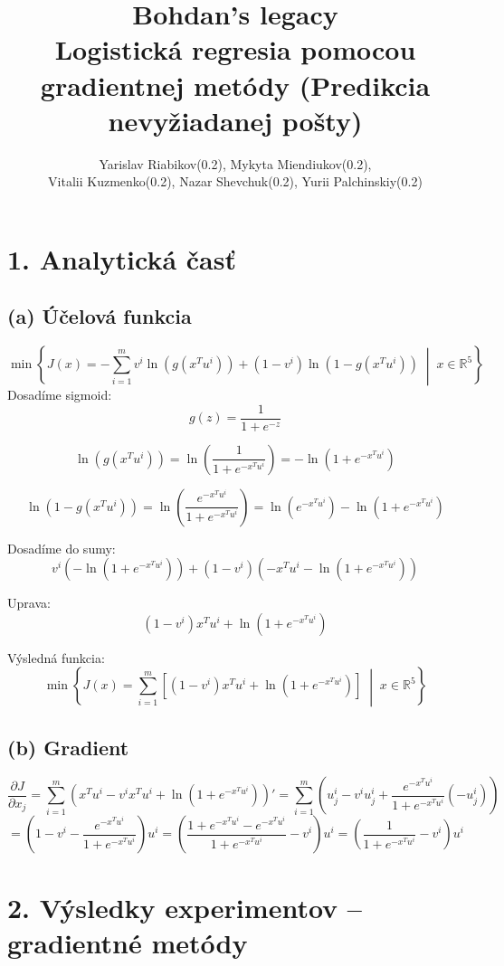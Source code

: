 \documentclass[titlepage]{article}
\title{Bohdan's legacy \\ 
Logistická regresia pomocou gradientnej metódy (Predikcia nevyžiadanej pošty)}
\author{Yarislav Riabikov(0.2), Mykyta Miendiukov(0.2),\\ Vitalii Kuzmenko(0.2), Nazar Shevchuk(0.2), Yurii Palchinskiy(0.2)}
\begin{document}
\date{}

\maketitle
\newpage


\maketitle

\section*{1. Analytická časť}

\subsection*{(a) Účelová funkcia}
\[
\min \left\{ J(x) =
-\sum_{i=1}^{m} v^i \ln \left( g(x^T u^i) \right)
+ (1 - v^i) \ln \left( 1 - g(x^T u^i) \right)
\;\middle|\; x \in \mathbb{R}^5 \right\}
\]
Dosadíme sigmoid:
\[
g(z) = \frac{1}{1 + e^{-z}}
\]

\[
\ln \left( g(x^T u^i) \right)
= \ln \left( \frac{1}{1 + e^{-x^T u^i}} \right)
= -\ln \left( 1 + e^{-x^T u^i} \right)
\]

\[
\ln \left( 1 - g(x^T u^i) \right)
= \ln \left( \frac{e^{-x^T u^i}}{1 + e^{-x^T u^i}} \right)
= \ln \left( e^{-x^T u^i} \right)
- \ln \left( 1 + e^{-x^T u^i} \right)
\]

Dosadíme do sumy:
\[
v^i \left(-\ln(1 + e^{-x^T u^i})\right)
+ (1 - v^i)\left( -x^T u^i - \ln(1 + e^{-x^T u^i}) \right)
\]

Uprava:
\[
(1 - v^i)x^T u^i + \ln(1 + e^{-x^T u^i})
\]

Výsledná funkcia:
\[
\min \left\{ J(x) =
\sum_{i=1}^{m} \left[(1 - v^i)x^T u^i + \ln(1 + e^{-x^T u^i})\right]
\;\middle|\; x \in \mathbb{R}^5 \right\}
\]


\subsection*{(b) Gradient}
\[ \frac{\partial J}{\partial x_j}=\sum_{i=1}^{m}(x^Tu^i-v^ix^Tu^i+\ln(1+e^{-x^Tu^i}))'=\sum_{i=1}^{m}(u_j^i - v^iu_j^i+\frac{e^{-x^Tu^i}}{1+e^{-x^Tu^i}}(-u_j^i))\] \[=(1-v^i-\frac{e^{-x^Tu^i}}{1+e^{-x^Tu^i}})u^i=(\frac{1+e^{-x^Tu^i}-e^{-x^Tu^i}}{1+e^{-x^Tu^i}}-v^i)u^i=(\frac{1}{1+e^{-x^Tu^i}}-v^i)u^i\]

\section*{2. Výsledky experimentov – gradientné metódy}
\end{document}
